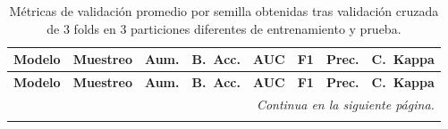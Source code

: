 \documentclass[a4paper,10pt]{book}
\begin{document}
\begin{scriptsize}
\begin{longtable}{@{}l l p{0.6cm} p{1.5cm} p{1.5cm} p{1.5cm} p{1.5cm} p{1.5cm}@{}}
\caption[Métricas de validación promedio por semilla]{Métricas de validación promedio por semilla obtenidas tras validación cruzada de 3 folds en 3 particiones diferentes de entrenamiento y prueba.}
\label{tab:per_seed_metrics_avg}\\
\toprule
\textbf{Modelo} & \textbf{Muestreo} & \textbf{Aum.} &
\textbf{B.\ Acc.} & \textbf{AUC} & \textbf{F1} &
\textbf{Prec.} & \textbf{C.\ Kappa} \\
\midrule
\endfirsthead

\toprule
\textbf{Modelo} & \textbf{Muestreo} & \textbf{Aum.} &
\textbf{B.\ Acc.} & \textbf{AUC} & \textbf{F1} &
\textbf{Prec.} & \textbf{C.\ Kappa} \\
\midrule
\endhead

\midrule
\multicolumn{8}{r}{\textit{Continua en la siguiente página.}}\\
\midrule
\endfoot


\end{longtable}
\end{scriptsize}
\end{document}
